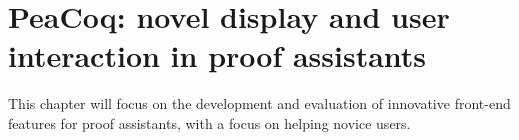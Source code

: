 \chapter{PeaCoq: novel display and user interaction in proof assistants}

This chapter will focus on the development and evaluation of innovative
front-end features for proof assistants, with a focus on helping novice users.






